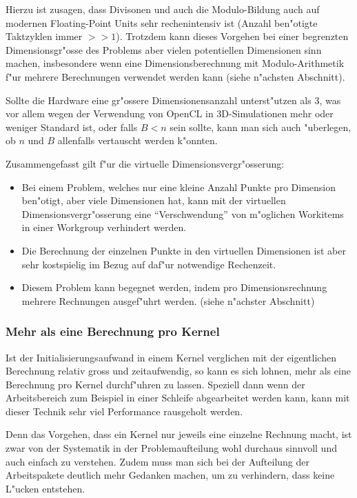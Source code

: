 \begin{refsection}
Hierzu ist zusagen, dass Divisonen und auch die Modulo-Bildung auch auf
modernen Floating-Point Units sehr rechenintensiv ist (Anzahl ben"otigte 
Taktzyklen immer $ >> 1 $). Trotzdem kann dieses Vorgehen bei einer 
begrenzten Dimensionsgr"osse des Problems aber vielen potentiellen 
Dimensionen sinn machen, insbesondere wenn eine Dimensionsberechnung mit
Modulo-Arithmetik f"ur mehrere Berechnungen verwendet werden kann
(siehe n"achsten Abschnitt).

Sollte die Hardware eine gr"ossere Dimensionensanzahl unterst"utzen als 
3, was vor allem wegen der Verwendung von OpenCL in 3D-Simulationen
mehr oder weniger Standard ist, oder falls $ B < n $ sein sollte, 
kann man sich auch "uberlegen, ob $ n $ und $ B $ allenfalls vertauscht
werden k"onnten.

Zusammengefasst gilt f"ur die virtuelle Dimensionsvergr"osserung:

\begin{itemize}
 \item Bei einem Problem, welches nur eine kleine Anzahl Punkte pro 
       Dimension ben"otigt, aber viele Dimensionen hat, kann mit der
       virtuellen Dimensionsvergr"osserung eine ``Verschwendung'' von
       m"oglichen Workitems in einer Workgroup verhindert werden.
 \item Die Berechnung der einzelnen Punkte in den virtuellen 
       Dimensionen ist aber sehr kostspielig im Bezug auf daf"ur notwendige
       Rechenzeit.
 \item Diesem Problem kann begegnet werden, indem pro Dimensionsrechnung
       mehrere Rechnungen ausgef"uhrt werden. (siehe n"achster Abschnitt)
\end{itemize}


\subsubsection{Mehr als eine Berechnung pro Kernel}

Ist der Initialisierungsaufwand in einem Kernel verglichen mit der eigentlichen
Berechnung relativ gross und zeitaufwendig, so kann es sich lohnen, mehr als 
eine Berechnung pro Kernel durchf"uhren zu lassen. Speziell dann wenn der 
Arbeitsbereich zum Beispiel in einer Schleife abgearbeitet werden kann, kann
mit dieser Technik sehr viel Performance rausgeholt werden.

Denn das Vorgehen, dass ein Kernel nur jeweils eine einzelne Rechnung macht, 
ist zwar von der Systematik in der Problemaufteilung wohl durchaus sinnvoll 
und auch einfach zu verstehen. Zudem muss man sich bei der Aufteilung der
Arbeitspakete deutlich mehr Gedanken machen, um zu verhindern, dass keine
L"ucken entstehen.


\end{refsection}
